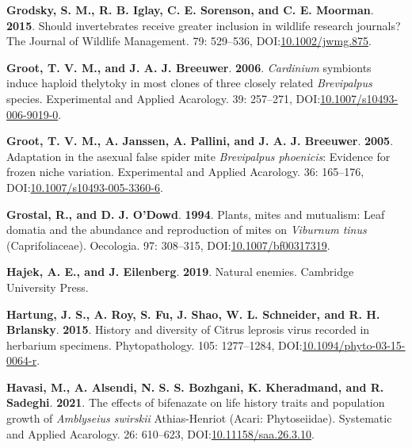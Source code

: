 \documentclass[12pt,final,CPage]{ufthesis}
\newlength{\cslhangindent}
\newenvironment{CSLReferences}[2] %
{%
	\setlength{\parindent}{0pt}
	\ifodd #1 \everypar{\setlength{\hangindent}{\cslhangindent}}\ignorespaces\fi
	\ifnum #2 > 0
	\setlength{\parskip}{#2\baselineskip}
	\fi
}%
{}
\begin{document}
{\begin{CSLReferences}{1}{0}
  \leavevmode{}%
  \textbf{Grodsky, S. M., R. B. Iglay, C. E. Sorenson, and C. E. Moorman}. \textbf{2015}. Should invertebrates receive greater inclusion in wildlife research journals? The Journal of Wildlife Management. 79: 529--536, DOI:\href{https://doi.org/10.1002/jwmg.875}{10.1002/jwmg.875}.

  \leavevmode{}%
  \textbf{Groot, T. V. M., and J. A. J. Breeuwer}. \textbf{2006}. \emph{Cardinium} symbionts induce haploid thelytoky in most clones of three closely related {\emph{Brevipalpus}} species. Experimental and Applied Acarology. 39: 257--271, DOI:\href{https://doi.org/10.1007/s10493-006-9019-0}{10.1007/s10493-006-9019-0}.

  \leavevmode{}%
  \textbf{Groot, T. V. M., A. Janssen, A. Pallini, and J. A. J. Breeuwer}. \textbf{2005}. Adaptation in the asexual false spider mite {\emph{Brevipalpus phoenicis}}: Evidence for frozen niche variation. Experimental and Applied Acarology. 36: 165--176, DOI:\href{https://doi.org/10.1007/s10493-005-3360-6}{10.1007/s10493-005-3360-6}.

  \leavevmode{}%
  \textbf{Grostal, R., and D. J. O'Dowd}. \textbf{1994}. Plants, mites and mutualism: Leaf domatia and the abundance and reproduction of mites on {\emph{Viburnum tinus}} ({Caprifoliaceae}). Oecologia. 97: 308--315, DOI:\href{https://doi.org/10.1007/bf00317319}{10.1007/bf00317319}.

  \leavevmode{}%
  \textbf{Hajek, A. E., and J. Eilenberg}. \textbf{2019}. Natural enemies. Cambridge University Press.

  \leavevmode{}%
  \textbf{Hartung, J. S., A. Roy, S. Fu, J. Shao, W. L. Schneider, and R. H. Brlansky}. \textbf{2015}. History and diversity of {Citrus leprosis virus} recorded in herbarium specimens. Phytopathology{\textregistered}. 105: 1277--1284, DOI:\href{https://doi.org/10.1094/phyto-03-15-0064-r}{10.1094/phyto-03-15-0064-r}.

  \leavevmode{}%
  \textbf{Havasi, M., A. Alsendi, N. S. S. Bozhgani, K. Kheradmand, and R. Sadeghi}. \textbf{2021}. The effects of bifenazate on life history traits and population growth of {\emph{Amblyseius swirskii}} {Athias-Henriot} ({Acari}: {Phytoseiidae}). Systematic and Applied Acarology. 26: 610--623, DOI:\href{https://doi.org/10.11158/saa.26.3.10}{10.11158/saa.26.3.10}.


\end{CSLReferences}}
\end{document}
